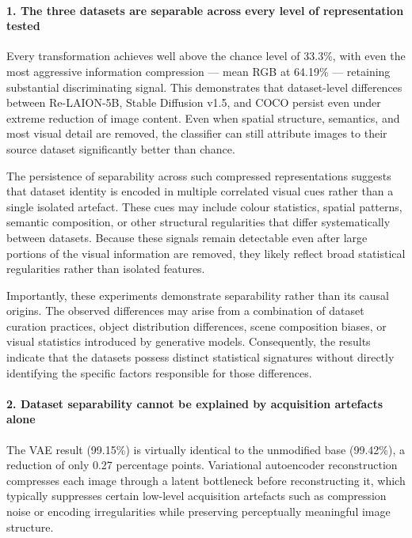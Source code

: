 \paragraph{1. The three datasets are separable across every level of representation tested}

Every transformation achieves well above the chance level of 33.3\%, with even the most aggressive information compression — mean RGB at 64.19\% — retaining substantial discriminating signal. This demonstrates that dataset-level differences between Re-LAION-5B, Stable Diffusion v1.5, and COCO persist even under extreme reduction of image content. Even when spatial structure, semantics, and most visual detail are removed, the classifier can still attribute images to their source dataset significantly better than chance.

The persistence of separability across such compressed representations suggests that dataset identity is encoded in multiple correlated visual cues rather than a single isolated artefact. These cues may include colour statistics, spatial patterns, semantic composition, or other structural regularities that differ systematically between datasets. Because these signals remain detectable even after large portions of the visual information are removed, they likely reflect broad statistical regularities rather than isolated features.

Importantly, these experiments demonstrate separability rather than its causal origins. The observed differences may arise from a combination of dataset curation practices, object distribution differences, scene composition biases, or visual statistics introduced by generative models. Consequently, the results indicate that the datasets possess distinct statistical signatures without directly identifying the specific factors responsible for those differences.

\paragraph{2. Dataset separability cannot be explained by acquisition artefacts alone}

The VAE result (99.15\%) is virtually identical to the unmodified base (99.42\%), a reduction of only 0.27 percentage points. Variational autoencoder reconstruction compresses each image through a latent bottleneck before reconstructing it, which typically suppresses certain low-level acquisition artefacts such as compression noise or encoding irregularities while preserving perceptually meaningful image structure.

